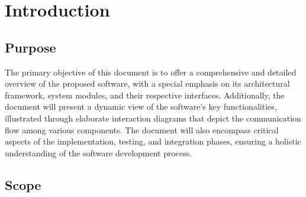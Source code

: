 \section{Introduction}

\subsection{Purpose}

The primary objective of this document is to offer a comprehensive and detailed overview of the proposed software, with a special emphasis on its architectural framework, system modules, and their respective interfaces. Additionally, the document will present a dynamic view of the software's key functionalities, illustrated through elaborate interaction diagrams that depict the communication flow among various components. The document will also encompass critical aspects of the implementation, testing, and integration phases, ensuring a holistic understanding of the software development process.


\subsection{Scope}

